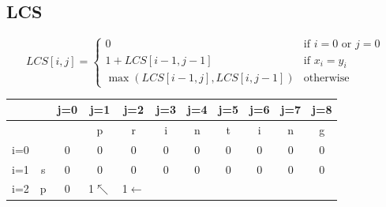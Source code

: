 \documentclass{article}
\begin{document}
\begin{multicols*}{2}
    \subsection*{LCS}
    \begin{equation*}
        LCS[i, j] = \begin{cases}
            0                              & \text{if } i = 0 \text{ or } j = 0 \\
            1 + LCS[i-1, j-1]              & \text{if } x_i = y_i               \\
            \max(LCS[i-1, j], LCS[i, j-1]) & \text{otherwise}
        \end{cases}
    \end{equation*}
    \hspace*{-1.5em}
    \begin{tabular}{|c|c|c|c|c|c|c|c|c|c|c|}
        \hline
                                       &                               & j=0 &
        j=1                            & j=2
                                       & j=3                           & j=4 &
        j=5                            & j=6
                                       & j=7                           & j=8     \\
        \hline
                                       &                               &     & p
                                       & r                             & i   & n
                                       & t                             & i   & n
                                       & g                                       \\
        \hline
        i=0                            &                               & 0   & 0
                                       & 0                             & 0   & 0
                                       & 0                             & 0   & 0
                                       & 0                                       \\
        \hline
        i=1                            & s                             & 0   & 0
                                       & 0                             & 0   & 0
                                       & 0                             & 0   & 0
                                       & 0                                       \\
        \hline
        i=2                            & p                             & 0   &
        \cellcolor{red!25} 1$\nwarrow$ &
        1$\leftarrow$                  &

\end{tabular}
\end{multicols*}
\end{document}
